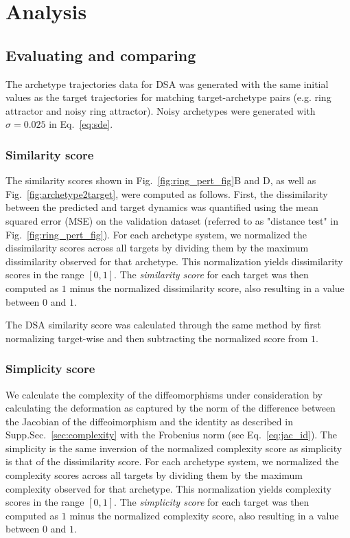 \documentclass{article}
\theoremstyle{definition} \newtheorem{definition}{Definition}  \newtheorem{example}{Example}
\theoremstyle{remark} \newtheorem{remark}{Remark}
\newcounter{ct}
\begin{document}
\newpage
\section{Analysis}

\subsection{Evaluating and comparing}
The archetype trajectories data  for DSA was generated with the same initial values as the target trajectories for matching target-archetype pairs (e.g. ring attractor and noisy ring attractor).
Noisy archetypes were generated with $\sigma=0.025$ in Eq.~\ref{eq:sde}.


\subsubsection{Similarity score}\label{sec:similarity_score}
The similarity scores shown in Fig.~\ref{fig:ring_pert_fig}B and D, as well as Fig.~\ref{fig:archetype2target}, were computed as follows.
First, the dissimilarity between the predicted and target dynamics was quantified using the mean squared error (MSE) on the validation dataset (referred to as "distance test" in Fig.~\ref{fig:ring_pert_fig}). 
For each archetype system, we normalized the dissimilarity scores across all targets by dividing them by the maximum dissimilarity observed for that archetype. 
This normalization yields dissimilarity scores in the range $[0, 1]$. 
The \emph{similarity score} for each target was then computed as $1$ minus the normalized dissimilarity score, also resulting in a value between $0$ and $1$.

 
The DSA similarity score was calculated through the same method by first normalizing target-wise and then subtracting the normalized score from $1$.



\subsubsection{Simplicity score}\label{sec:simplicity_score}
We calculate the complexity of the diffeomorphisms under consideration by calculating the deformation as captured by the norm of the difference between the Jacobian of the diffeoimorphism and the identity as described in Supp.Sec.~\ref{sec:complexity} with the Frobenius norm (see Eq.~\ref{eq:jac_id}).
The simplicity is the same inversion of the normalized complexity score as simplicity is that of the dissimilarity score.
For each archetype system, we normalized the complexity scores across all targets by dividing them by the maximum complexity observed for that archetype. 
This normalization yields complexity scores in the range $[0, 1]$. 
The \emph{simplicity score} for each target was then computed as $1$ minus the normalized complexity score, also resulting in a value between $0$ and $1$.
\end{document}
